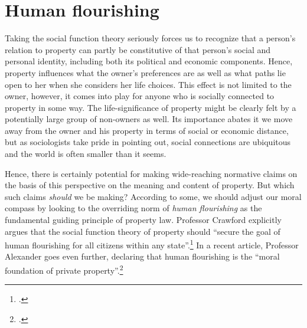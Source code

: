 \section{Human flourishing}

Taking the social function theory seriously forces us to recognize that a person's relation to property can partly be constitutive of that person's social and personal identity, including both its political and economic components. Hence, property influences what the owner's preferences are as well as what paths lie open to her when she considers her life choices. This effect is not limited to the owner, however, it comes into play for anyone who is socially connected to property in some way. The life-significance of property might be clearly felt by a potentially large group of non-owners as well. Its importance abates it we move away from the owner and his property in terms of social or economic distance, but as sociologists take pride in pointing out, social connections are ubiquitous  and the world is often smaller than it seems. 

Hence, there is certainly potential for making wide-reaching normative claims on the basis of this perspective on the meaning and content of property. But which such claims {\it should} we be making? According to some, we should adjust our moral compass by looking to the overriding norm of {\it human flourishing} as the fundamental guiding principle of property law. Professor Crawford explicitly argues that the social function theory of property should ``secure the goal of human flourishing for all citizens within any state''.\footcite[1089]{crawford12} In a recent article, Professor Alexander goes even further, declaring that human flourishing is the ``moral foundation of private property''.\footcite[1261]{alexander14} 

